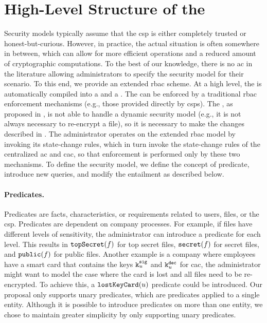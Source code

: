 \section{High-Level Structure of the \Hybrid}
\label{sec:hybrid.structure}


Security models typically assume that the \gls{csp} is either completely trusted or honest-but-curious. However, in practice, the actual situation is often somewhere in between, which can allow for more efficient operations and a reduced amount of cryptographic computations. To the best of our knowledge, there is no \gls{ac} \erbacwhat in the literature allowing administrators to specify the security model for their scenario. To this end, we provide an extended \gls{rbac} scheme.
At a high level, the \erbac is automatically compiled into a \centralized and a \cac. The \centralized can be enforced by a traditional \gls{rbac} enforcement mechanisms (e.g., those provided directly by \glspl{csp}). The \cac, as proposed in \cite{cac}, is not able to handle a dynamic security model (e.g., it is not always necessary to re-encrypt a file), so it is necessary to make the changes described in . The administrator operates on the extended \gls{rbac} model by invoking its state-change rules, which in turn invoke the state-change rules of the centralized \gls{ac} and \gls{cac}, so that enforcement is performed only by these two mechanisms.
To define the security model, we define the concept of predicate, introduce new queries, and modify the entailment as described below.

\paragraph{Predicates.} Predicates are facts, characteristics, or requirements related to users, files, or the \gls{csp}. Predicates are dependent on company processes. For example, if files have different levels of sensitivity, the administrator can introduce a predicate for each level. This results in \( \mathtt{topSecret}(f) \) for top secret files, \( \mathtt{secret}(f) \) for secret files, and \( \mathtt{public}(f) \) for public files. Another example is a company where employees have a smart card that contains the keys \( \mathtt{k}^{\mathtt{sig}}_{u} \) and \( \mathtt{k}^{\mathtt{dec}}_{u} \) for \gls{cac}, the administrator might want to model the case where the card is lost and all files need to be re-encrypted. To achieve this, a \( \mathtt{lostKeyCard}(u) \) predicate could be introduced. Our proposal only supports unary predicates, which are predicates applied to a single entity. Although it is possible to introduce predicates on more than one entity, we chose to maintain greater simplicity by only supporting unary predicates.

